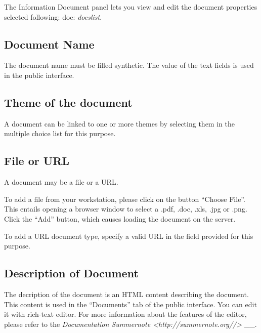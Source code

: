 \documentclass[letterpaper,10pt,english]{sphinxmanual}
\begin{document}
The Information Document panel lets you view and edit the document properties selected following: doc: \emph{docslist}.



\subsection{Document Name}
\label{documents/infopanel:nom-du-document}
The document name must be filled synthetic. The value of the text fields is used in the public interface.


\subsection{Theme of the document}
\label{documents/infopanel:theme-du-document}
A document can be linked to one or more themes by selecting them in the multiple choice list for this purpose.


\subsection{File or URL}
\label{documents/infopanel:fichier-ou-url}
A document may be a file or a URL.

To add a file from your workstation, please click on the button ``Choose File''. This entails opening a browser window to select a .pdf, .doc, .xls, .jpg or .png. Click the ``Add'' button, which causes loading the document on the server.

To add a URL document type, specify a valid URL in the field provided for this purpose.


\subsection{Description of Document}
\label{documents/infopanel:description-du-document}
The decription of the document is an HTML content describing the document. This content is used in the ``Documents'' tab of the public interface. You can edit it with rich-text editor. For more information about the features of the editor, please refer to the \emph{Documentation Summernote \textless{}http://summernote.org//\textgreater{}} \_\_.
\end{document}

